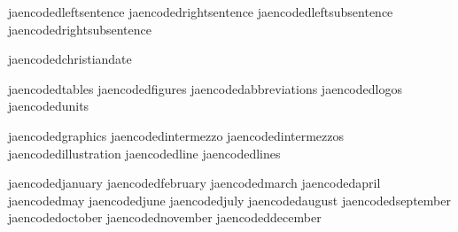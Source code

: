 
\startencoding[j-uni]

   jaencodedleftsentence     {}
   jaencodedrightsentence    {}
   jaencodedleftsubsentence  {}
   jaencodedrightsubsentence {}

\stopencoding


\startencoding[j-uni]

   jaencodedchristiandate {}

   jaencodedtables        {}
   jaencodedfigures       {}
   jaencodedabbreviations {}
   jaencodedlogos         {}
   jaencodedunits         {}

   jaencodedgraphics      {}
   jaencodedintermezzo    {}
   jaencodedintermezzos   {}
   jaencodedillustration  {}
   jaencodedline          {}
   jaencodedlines         {}

   jaencodedjanuary       {}
   jaencodedfebruary      {}
   jaencodedmarch         {}
   jaencodedapril         {}
   jaencodedmay           {}
   jaencodedjune          {}
   jaencodedjuly          {}
   jaencodedaugust        {}
   jaencodedseptember     {}
   jaencodedoctober       {}
   jaencodednovember      {}
   jaencodeddecember      {}

